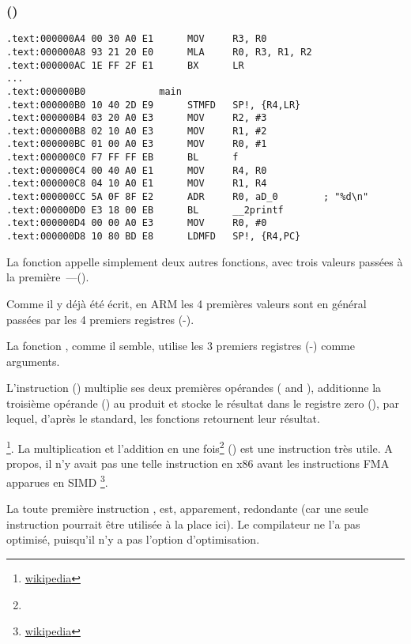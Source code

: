 \subsubsection{\NonOptimizingKeilVI (\ARMMode)}

\begin{lstlisting}[style=customasmARM]
.text:000000A4 00 30 A0 E1      MOV     R3, R0
.text:000000A8 93 21 20 E0      MLA     R0, R3, R1, R2
.text:000000AC 1E FF 2F E1      BX      LR
...
.text:000000B0             main
.text:000000B0 10 40 2D E9      STMFD   SP!, {R4,LR}
.text:000000B4 03 20 A0 E3      MOV     R2, #3
.text:000000B8 02 10 A0 E3      MOV     R1, #2
.text:000000BC 01 00 A0 E3      MOV     R0, #1
.text:000000C0 F7 FF FF EB      BL      f
.text:000000C4 00 40 A0 E1      MOV     R4, R0
.text:000000C8 04 10 A0 E1      MOV     R1, R4
.text:000000CC 5A 0F 8F E2      ADR     R0, aD_0        ; "%d\n"
.text:000000D0 E3 18 00 EB      BL      __2printf
.text:000000D4 00 00 A0 E3      MOV     R0, #0
.text:000000D8 10 80 BD E8      LDMFD   SP!, {R4,PC}
\end{lstlisting}

La fonction \main appelle simplement deux autres fonctions, avec trois valeurs passées
à la première~---(\ttf).

Comme il y déjà été écrit, en ARM les 4 premières valeurs sont en général
passées par les 4 premiers registres (-).

La fonction \ttf, comme il semble, utilise les 3 premiers registres (-) comme arguments. 

L'instruction  () multiplie ses deux premières opérandes
( and ), additionne la troisième opérande () au produit et stocke
le résultat dans le registre zero (), par lequel, d'après le standard, les
fonctions retournent leur résultat.

\footnote{\href{http://go.yurichev.com/17103}{wikipedia}}.
La multiplication et l'addition en une fois\footnote{\WPMAO} ()
est une instruction très utile. A propos, il n'y avait pas une telle instruction en
x86 avant les instructions FMA apparues en SIMD
\footnote{\href{http://go.yurichev.com/17103}{wikipedia}}.

La toute première instruction , est, apparement, redondante (car
une seule instruction  pourrait être utilisée à la place ici).
Le compilateur ne l'a pas optimisé, puisqu'il n'y a pas l'option d'optimisation.

